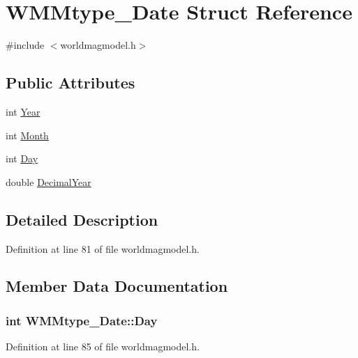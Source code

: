 \hypertarget{struct_w_m_mtype___date}{\section{\-W\-M\-Mtype\-\_\-\-Date \-Struct \-Reference}
\label{struct_w_m_mtype___date}
}


{\ttfamily \#include $<$worldmagmodel.\-h$>$}

\subsection*{\-Public \-Attributes}
\begin{DoxyCompactItemize}
\item 
int \hyperlink{struct_w_m_mtype___date_a6a93268d51911bf52e36f3096b1c263f}{\-Year}
\item 
int \hyperlink{struct_w_m_mtype___date_a8c47663c3abf7deaf85b9f7630d51738}{\-Month}
\item 
int \hyperlink{struct_w_m_mtype___date_aedcd09138d6c752ba3b58a30ade9dc6b}{\-Day}
\item 
double \hyperlink{struct_w_m_mtype___date_a66b662f919345a2e81889ef080947ec1}{\-Decimal\-Year}
\end{DoxyCompactItemize}


\subsection{\-Detailed \-Description}


\-Definition at line 81 of file worldmagmodel.\-h.



\subsection{\-Member \-Data \-Documentation}
\hypertarget{struct_w_m_mtype___date_aedcd09138d6c752ba3b58a30ade9dc6b}{
\subsubsection[{\-Day}]{\setlength{\rightskip}{0pt plus 5cm}int {\bf \-W\-M\-Mtype\-\_\-\-Date\-::\-Day}}}\label{struct_w_m_mtype___date_aedcd09138d6c752ba3b58a30ade9dc6b}


\-Definition at line 85 of file worldmagmodel.\-h.

